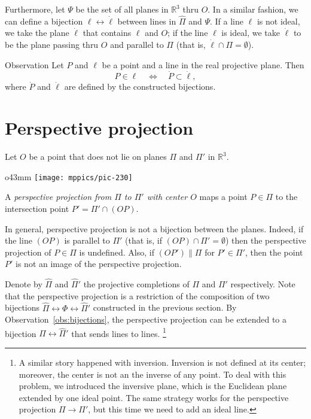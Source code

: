 Furthermore, let $\Psi$ be the set of all planes in $\mathbb{R}^3$ thru $O$.
In a similar fashion, we can define a bijection $\ell\leftrightarrow \dot \ell$ between lines in $\hat \Pi$ and $\Psi$.
If a line $\ell$ is not ideal, we take the plane $\dot \ell$ that contains $\ell$ and $O$;
if the line $\ell$ is ideal, we take $\dot \ell$ to be the plane passing thru $O$ and parallel to $\Pi$ (that is, $\dot\ell\cap\Pi=\emptyset$).

\begin{thm}{Observation}\label{obs:bijections}
Let $P$ and $\ell$ be a point and a line in the real projective plane.
Then 
\[P\in \ell \quad\iff\quad \dot P\subset \dot \ell,\]
where $\dot P$ and $\dot \ell$ are defined by the constructed bijections.
\end{thm}

\section{Perspective projection}
\label{sec:perspective-projection}

Let $O$ be a point that does not lie on planes $\Pi$ and $\Pi'$ in $\mathbb{R}^3$.

\begin{wrapfigure}{o}{43mm}
\centering
\vskip-4mm
\texttt{[image: mppics/pic-230]}
\end{wrapfigure}

A \emph{perspective projection from $\Pi$ to $\Pi'$ with center $O$} maps a point $P\in \Pi$
to the intersection point $P'=\Pi'\cap (OP)$.

In general, perspective projection is not a bijection between the planes.
Indeed, if the line $(OP)$ is parallel to $\Pi'$ 
(that is, if $(OP)\cap\Pi'=\emptyset$)
then the perspective projection of $P\in \Pi$ is undefined.
Also, if $(OP')\parallel \Pi$ 
for $P'\in \Pi'$,
then the point $P'$ is not an image of the perspective projection.

Denote by $\hat \Pi$ and $\hat \Pi'$ the projective completions of $\Pi$ and $\Pi'$ respectively. 
Note that the perspective projection is a restriction of the composition of two bijections $\hat \Pi\leftrightarrow\Phi \leftrightarrow\hat \Pi'$ constructed in the previous section.
By Observation~\ref{obs:bijections}, the perspective projection can be extended to a bijection $\hat \Pi\leftrightarrow\hat \Pi'$ that sends lines to lines.%
\footnote{A similar story happened with inversion.
Inversion is not defined at its center;
moreover, the center is not an the inverse of any point.
To deal with this problem, we introduced the inversive plane, 
which is the Euclidean plane extended by one ideal point.
The same strategy works for the perspective projection $\Pi\to\Pi'$, but this time we need to add an ideal line.}

